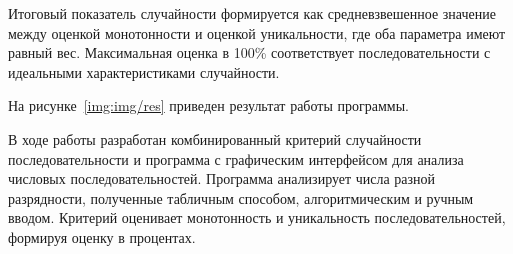 Итоговый показатель случайности формируется как средневзвешенное значение между оценкой монотонности и оценкой уникальности, где оба параметра имеют равный вес. Максимальная оценка в 100\% соответствует последовательности с идеальными характеристиками случайности.

На рисунке~\ref{img:img/res} приведен результат работы программы.

\FloatBarrier
{}
\FloatBarrier

В ходе работы разработан комбинированный критерий случайности последовательности и программа с графическим интерфейсом для анализа числовых последовательностей. Программа анализирует числа разной разрядности, полученные табличным способом, алгоритмическим и ручным вводом. Критерий оценивает монотонность и уникальность последовательностей, формируя оценку в процентах.

